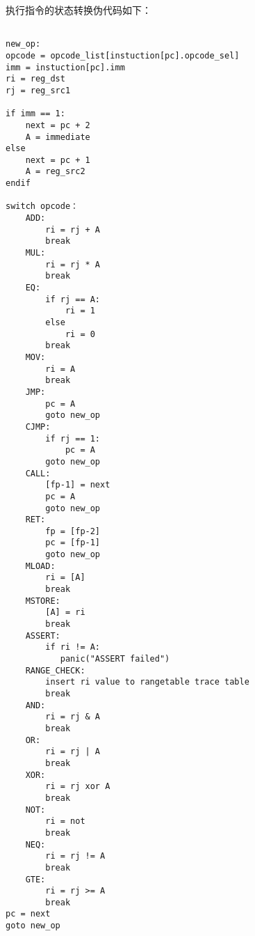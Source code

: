 \begin{table}[!ht]
    \centering {}
    \caption{OlaVM指令编码格式}
    \label{table: processor_instruction_decode}
\end{table}

执行指令的状态转换伪代码如下：
\begin{lstlisting}[language={}]

new_op:
opcode = opcode_list[instuction[pc].opcode_sel]
imm = instuction[pc].imm
ri = reg_dst
rj = reg_src1

if imm == 1:
    next = pc + 2
    A = immediate
else
    next = pc + 1
    A = reg_src2
endif

switch opcode：
    ADD:
        ri = rj + A
        break
    MUL:
        ri = rj * A
        break
    EQ:
        if rj == A:
            ri = 1
        else
            ri = 0
        break
    MOV:
        ri = A
        break
    JMP:
        pc = A
        goto new_op
    CJMP:
        if rj == 1:
            pc = A
        goto new_op
    CALL:
        [fp-1] = next
        pc = A
        goto new_op
    RET:
        fp = [fp-2]
        pc = [fp-1]
        goto new_op
    MLOAD:
        ri = [A]
        break
    MSTORE:
        [A] = ri
        break
    ASSERT:
        if ri != A:
           panic("ASSERT failed")
    RANGE_CHECK:
        insert ri value to rangetable trace table
        break
    AND:
        ri = rj & A
        break
    OR:
        ri = rj | A
        break
    XOR:
        ri = rj xor A
        break
    NOT:
        ri = not
        break
    NEQ:
        ri = rj != A
        break
    GTE:
        ri = rj >= A
        break
pc = next
goto new_op
\end{lstlisting}

